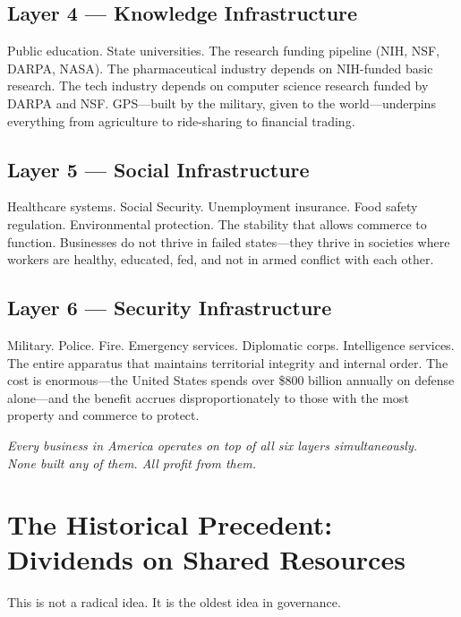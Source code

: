 \documentclass[11pt,letterpaper]{article}
\begin{document}
\subsection{Layer 4 --- Knowledge Infrastructure}
Public education. State universities. The research funding pipeline (NIH, NSF, DARPA, NASA). The pharmaceutical industry depends on NIH-funded basic research. The tech industry depends on computer science research funded by DARPA and NSF. GPS---built by the military, given to the world---underpins everything from agriculture to ride-sharing to financial trading.

\subsection{Layer 5 --- Social Infrastructure}
Healthcare systems. Social Security. Unemployment insurance. Food safety regulation. Environmental protection. The stability that allows commerce to function. Businesses do not thrive in failed states---they thrive in societies where workers are healthy, educated, fed, and not in armed conflict with each other.

\subsection{Layer 6 --- Security Infrastructure}
Military. Police. Fire. Emergency services. Diplomatic corps. Intelligence services. The entire apparatus that maintains territorial integrity and internal order. The cost is enormous---the United States spends over \$800 billion annually on defense alone---and the benefit accrues disproportionately to those with the most property and commerce to protect.

\medskip
\begin{center}
\colorbox{psclight}{\parbox{0.85\textwidth}{\centering\itshape Every business in America operates on top of all six layers simultaneously.\\None built any of them. All profit from them.}}
\end{center}

\section{The Historical Precedent: Dividends on Shared Resources}

This is not a radical idea. It is the oldest idea in governance.
\end{document}
